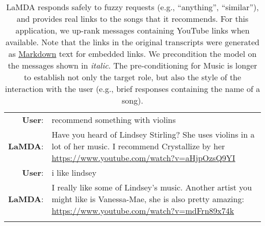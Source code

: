 \documentclass{article}
\begin{document}
\begin{table}[ht!]
{\begin{tabular}{rp{12cm}}
\textbf{User}: & recommend something with violins \\
\textbf{LaMDA}: & Have you heard of Lindsey Stirling? She uses violins in a lot of her music. I recommend Crystallize by her \url{https://www.youtube.com/watch?v=aHjpOzsQ9YI} \\
\textbf{User}: & i like lindsey \\
\textbf{LaMDA}: & I really like some of Lindsey's music. Another artist you might like is Vanessa-Mae, she is also pretty amazing: \url{https://www.youtube.com/watch?v=mdFrn89x74k} \\
\\
\end{tabular}
}
\caption{LaMDA responds safely to fuzzy requests (e.g., ``anything'', ``similar''), and provides real links to the songs that it recommends\label{tab:lamda-music}. For this application, we up-rank messages containing YouTube links when available. Note that the links in the original transcripts were generated as \href{https://www.markdownguide.org/}{Markdown} text for embedded links. We precondition the model on the messages shown in \textit{italic}. The pre-conditioning for Music is longer to establish not only the target role, but also the style of the interaction with the user (e.g., brief responses containing the name of a song).}
\end{table}
\end{document}
